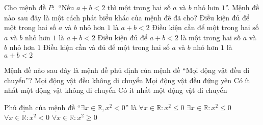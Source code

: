 \begin{ex}%
Cho mệnh đề $P\colon$ ``Nếu $a+b<2$ thì một trong hai số $a$ và $b$ nhỏ hơn $1$''. Mệnh đề nào sau đây là một cách phát biểu khác của mệnh đề đã cho?
\choice
{\True Điều kiện đủ để một trong hai số $a$ và $b$ nhỏ hơn $1$ là $a+b<2$}
{Điều kiện cần để một trong hai số $a$ và $b$ nhỏ hơn $1$ là $a+b<2$}
{Điều kiện đủ để $a+b<2$ là một trong hai số $a$ và $b$ nhỏ hơn $1$}
{Điều kiện cần và đủ để một trong hai số $a$ và $b$ nhỏ hơn $1$ là $a+b<2$}
\end{ex}

\begin{ex}%
Mệnh đề nào sau đây là mệnh đề phủ định của mệnh đề ``Mọi động vật đều di chuyển''?
\choice
{Mọi động vật đều không di chuyển}
{Mọi động vật đều đứng yên}
{\True Có ít nhất một động vật không di chuyển}
{Có ít nhất một động vật di chuyển}
\end{ex}

\begin{ex}%
Phủ định của mệnh đề ``$\exists x\in\mathbb{R}, x^2<0$'' là
\choice
{$\forall x\in\mathbb{R}\colon x^2\le0$}
{$\exists x\in\mathbb{R}\colon x^2\le0$}
{$\forall x\in\mathbb{R}\colon x^2<0$}
{\True $\forall x\in\mathbb{R}\colon x^2\ge0$}
\end{ex}


